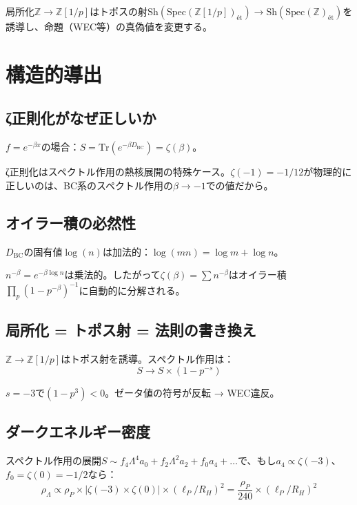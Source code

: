 \documentclass[11pt,a4paper]{article}
\newcommand{\Spec}{\mathrm{Spec}}
\newcommand{\Sh}{\mathrm{Sh}}
\newcommand{\Zp}{\mathbb{Z}[1/p]}
\begin{document}
局所化$\mathbb{Z} \to \Zp$はトポスの射$\Sh(\Spec(\Zp)_{\text{ét}}) \to \Sh(\Spec(\mathbb{Z})_{\text{ét}})$を誘導し、命題（WEC等）の真偽値を変更する。

\section{構造的導出}

\subsection{ζ正則化がなぜ正しいか}

$f = e^{-\beta x}$の場合：$S = \mathrm{Tr}(e^{-\beta D_{\mathrm{BC}}}) = \zeta(\beta)$。

ζ正則化はスペクトル作用の熱核展開の特殊ケース。$\zeta(-1) = -1/12$が物理的に正しいのは、BC系のスペクトル作用の$\beta \to -1$での値だから。

\subsection{オイラー積の必然性}

$D_{\mathrm{BC}}$の固有値$\log(n)$は加法的：$\log(mn) = \log m + \log n$。

$n^{-\beta} = e^{-\beta\log n}$は乗法的。したがって$\zeta(\beta) = \sum n^{-\beta}$はオイラー積$\prod_p(1-p^{-\beta})^{-1}$に自動的に分解される。

\subsection{局所化 = トポス射 = 法則の書き換え}

$\mathbb{Z} \to \Zp$はトポス射を誘導。スペクトル作用は：
\begin{equation}
S \to S \times (1 - p^{-s})
\end{equation}

$s = -3$で$(1-p^3) < 0$。ゼータ値の符号が反転 → WEC違反。

\subsection{ダークエネルギー密度}

スペクトル作用の展開$S \sim f_4\Lambda^4 a_0 + f_2\Lambda^2 a_2 + f_0 a_4 + \ldots$で、もし$a_4 \propto \zeta(-3)$、$f_0 = \zeta(0) = -1/2$なら：
\begin{equation}
\rho_\Lambda \propto \rho_P \times |\zeta(-3) \times \zeta(0)| \times (\ell_P/R_H)^2 = \frac{\rho_P}{240} \times (\ell_P/R_H)^2
\end{equation}
\end{document}
